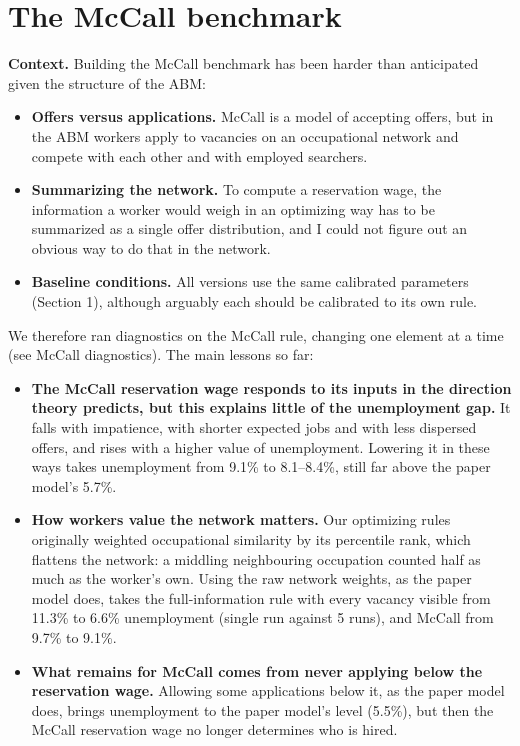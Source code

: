 \documentclass[10pt]{article}
\begin{document}
\section{The McCall benchmark}
\textbf{Context.} Building the McCall benchmark has been harder than anticipated given the structure of the
ABM:
\begin{itemize}[leftmargin=*]
  \item \textbf{Offers versus applications.} McCall is a model of accepting offers, but in the ABM workers
  apply to vacancies on an occupational network and compete with each other and with employed searchers.
  \item \textbf{Summarizing the network.} To compute a reservation wage, the information a worker would weigh in
  an optimizing way has to be summarized as a single offer distribution, and I could not figure out an obvious
  way to do that in the network.
  \item \textbf{Baseline conditions.} All versions use the same calibrated parameters (Section 1), although
  arguably each should be calibrated to its own rule.
\end{itemize}
We therefore ran diagnostics on the McCall rule, changing one element at a time (see McCall diagnostics). The
main lessons so far:
\begin{itemize}[leftmargin=*]
  \item \textbf{The McCall reservation wage responds to its inputs in the direction theory predicts, but this
  explains little of the unemployment gap.} It falls with impatience, with shorter expected jobs and with less
  dispersed offers, and rises with a higher value of unemployment. Lowering it in these ways takes unemployment
  from 9.1\% to 8.1--8.4\%, still far above the paper model's 5.7\%.
  \item \textbf{How workers value the network matters.} Our optimizing rules originally weighted occupational
  similarity by its percentile rank, which flattens the network: a middling neighbouring occupation counted half
  as much as the worker's own. Using the raw network weights, as the paper model does, takes the
  full-information rule with every vacancy visible from 11.3\% to 6.6\% unemployment (single run against 5 runs),
  and McCall from 9.7\% to 9.1\%.
  \item \textbf{What remains for McCall comes from never applying below the reservation wage.} Allowing some
  applications below it, as the paper model does, brings unemployment to the paper model's level (5.5\%), but
  then the McCall reservation wage no longer determines who is hired.
\end{itemize}
\end{document}
